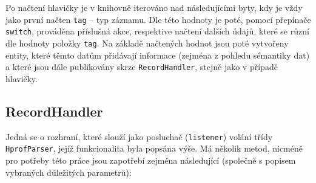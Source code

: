 Po načtení hlavičky je v knihovně iterováno nad následujícími byty, kdy je vždy jako první načten \texttt{tag} -- typ záznamu. Dle této hodnoty je poté, pomocí přepínače \texttt{switch}, prováděna příslušná akce, respektive načtení dalších údajů, které se různí dle hodnoty položky \texttt{tag}. Na základě načtených hodnot jsou poté vytvořeny entity, které těmto datům přidávají informace (zejména z pohledu sémantiky dat) a které jsou dále publikovány skrze \texttt{RecordHandler}, stejně jako v případě hlavičky.

\subsection{RecordHandler}
Jedná se o rozhraní, které slouží jako posluchač (\texttt{listener}) volání třídy \texttt{HprofParser}, jejíž funkcionalita byla popsána výše. Má několik metod, nicméně pro potřeby této práce jsou zapotřebí zejména následující (společně s popisem vybraných důležitých parametrů):


